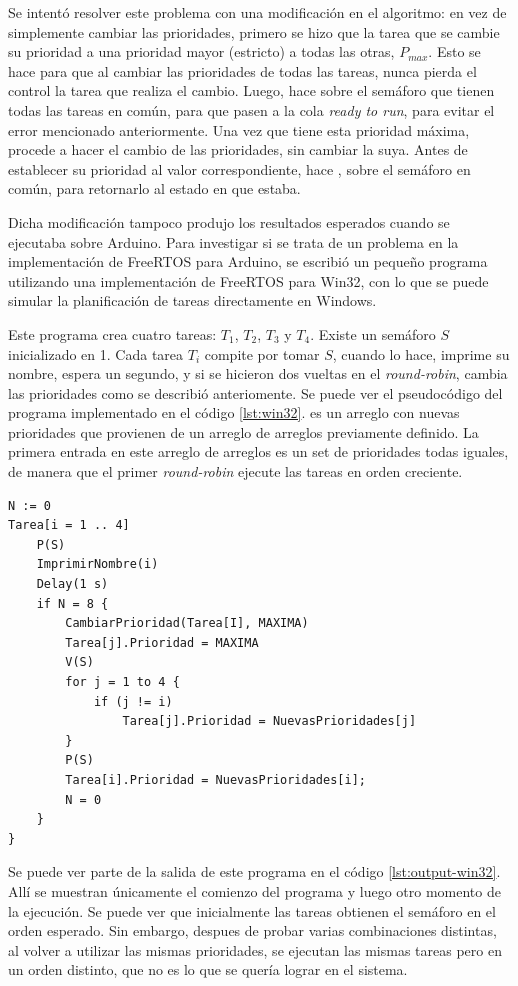 Se intentó resolver este problema con una modificación en el algoritmo: en vez de simplemente cambiar las prioridades, primero se hizo que la tarea que se cambie su prioridad a una prioridad mayor (estricto) a todas las otras, $P_{max}$.
Esto se hace para que al cambiar las prioridades de todas las tareas, nunca pierda el control la tarea que realiza el cambio.
Luego, hace  sobre el semáforo que tienen todas las tareas en común, para que pasen a la cola \emph{ready to run}, para evitar el error mencionado anteriormente.
Una vez que tiene esta prioridad máxima, procede a hacer el cambio de las prioridades, sin cambiar la suya.
Antes de establecer su prioridad al valor correspondiente, hace , sobre el semáforo en común, para retornarlo al estado en que estaba.

Dicha modificación tampoco produjo los resultados esperados cuando se ejecutaba sobre Arduino.
Para investigar si se trata de un problema en la implementación de FreeRTOS para Arduino, se escribió un pequeño programa utilizando una implementación de FreeRTOS para Win32, con lo que se puede simular la planificación de tareas directamente en Windows.

Este programa crea cuatro tareas: $T_1$, $T_2$, $T_3$ y $T_4$. Existe un semáforo $S$ inicializado en 1.
Cada tarea $T_i$ compite por tomar $S$, cuando lo hace, imprime su nombre, espera un segundo, y si se hicieron dos vueltas en el \emph{round-robin}, cambia las prioridades como se describió anteriomente. Se puede ver el pseudocódigo del programa implementado en el código \ref{lst:win32}.  es un arreglo con nuevas prioridades que provienen de un arreglo de arreglos previamente definido. La primera entrada en este arreglo de arreglos es un set de prioridades todas iguales, de manera que el primer \emph{round-robin} ejecute las tareas en orden creciente.

\begin{lstlisting}[float, label=lst:win32, caption=Pseudocódigo del programa escrito para FreeRTOS-Win32.]
N := 0
Tarea[i = 1 .. 4]
	P(S)
	ImprimirNombre(i)
	Delay(1 s)
	if N = 8 {
		CambiarPrioridad(Tarea[I], MAXIMA)
		Tarea[j].Prioridad = MAXIMA
		V(S)
		for j = 1 to 4 {
			if (j != i)
				Tarea[j].Prioridad = NuevasPrioridades[j]
		}
		P(S)
		Tarea[i].Prioridad = NuevasPrioridades[i];
		N = 0
	}
}
\end{lstlisting}

Se puede ver parte de la salida de este programa en el código \ref{lst:output-win32}. Allí se muestran únicamente el comienzo del programa y luego otro momento de la ejecución. Se puede ver que inicialmente las tareas obtienen el semáforo en el orden esperado. Sin embargo, despues de probar varias combinaciones distintas, al volver a utilizar las mismas prioridades, se ejecutan las mismas tareas pero en un orden distinto, que no es lo que se quería lograr en el sistema.

